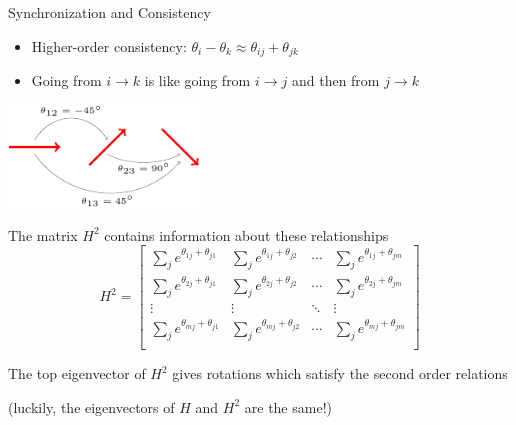 \documentclass[10pt]{beamer}
\begin{document}
\begin{frame}{Synchronization and Consistency}

\begin{minipage}[b]{0.5\textwidth}
\begin{itemize}

\item Higher-order consistency: $\theta_i - \theta_k \approx \theta_{ij} + \theta_{jk}$

\item Going from $i \rightarrow k$ is like going from $i \rightarrow j$ and then from $j \rightarrow k$

\end{itemize}
\end{minipage}
%
\includegraphics[width=2in]{synchronization1}

\begin{center}

The matrix $H^2$ contains information about these relationships
$$H^2 = \begin{bmatrix}
\sum_j e^{\theta_{1j} + \theta_{j1}} & \sum_j e^{\theta_{1j} + \theta_{j2}} & \cdots & \sum_j e^{\theta_{1j} + \theta_{jm}}  \\
\sum_j e^{\theta_{2j} + \theta_{j1}} & \sum_j e^{\theta_{2j} + \theta_{j2}} & \cdots & \sum_j e^{\theta_{2j} + \theta_{jm}}  \\\vdots & \vdots & \ddots & \vdots \\
\sum_j e^{\theta_{mj} + \theta_{j1}} & \sum_j e^{\theta_{mj} + \theta_{j2}} & \cdots & \sum_j e^{\theta_{mj} + \theta_{jm}}  \\\end{bmatrix} $$

The top eigenvector of $H^2$ gives rotations which satisfy the second order relations

(luckily, the eigenvectors of $H$ and $H^2$ are the same!)

\end{center}

\end{frame}
\end{document}
